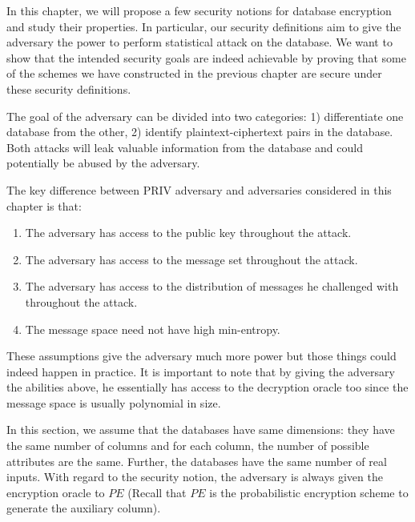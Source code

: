 In this chapter, we will propose a few security notions for database encryption and study their properties. In particular, our security definitions aim to give the adversary the power to perform statistical attack on the database. We want to show that the intended security goals are indeed achievable by proving that some of the schemes we have constructed in the previous chapter are secure under these security definitions.

The goal of the adversary can be divided into two categories: 1) differentiate one database from the other, 2) identify plaintext-ciphertext pairs in the database. Both attacks will leak valuable information from the database and could potentially be abused by the adversary.

The key difference between PRIV adversary and adversaries considered in this chapter is that:
\begin{enumerate}
\item The adversary has access to the public key throughout the attack.
\item The adversary has access to the message set throughout the attack.
\item The adversary has access to the distribution of messages he challenged with throughout the attack.
\item The message space need not have high min-entropy.
\end{enumerate}
These assumptions give the adversary much more power but those things could indeed happen in practice. It is important to note that by giving the adversary the abilities above, he essentially has access to the decryption oracle too since the message space is usually polynomial in size.

In this section, we assume that the databases have same dimensions: they have the same number of columns and for each column, the number of possible attributes are the same. Further, the databases have the same number of real inputs. With regard to the security notion, the adversary is always given the encryption oracle to $PE$ (Recall that $PE$ is the probabilistic encryption scheme to generate the auxiliary column).




